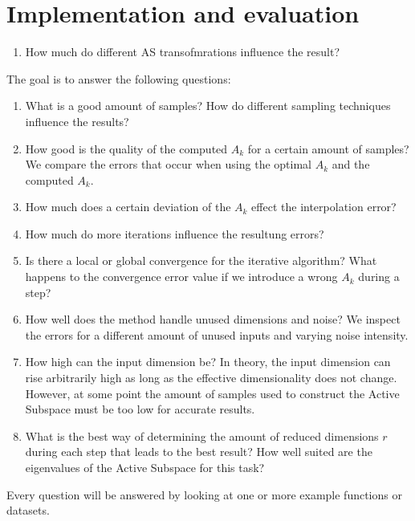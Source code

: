 \documentclass[
  a4paper,  %
  twoside,  %
  bibliography=totoc,
  headsepline,
  cleardoublepage=empty,
  parskip=half,
  draft=false
]{scrbook}
\begin{document}
\chapter{Implementation and evaluation}

\begin{enumerate}
\item How much do different AS transofmrations influence the result?
\end{enumerate}

The goal is to answer the following questions:

\begin{enumerate}
\item What is a good amount of samples? How do different sampling techniques influence the results?

\item How good is the quality of the computed $A_k$ for a certain amount of samples? We compare the errors that occur when using the optimal $A_k$ and the computed $A_k$.

\item How much does a certain deviation of the $A_k$ effect the interpolation error?

\item How much do more iterations influence the resultung errors?

\item Is there a local or global convergence for the iterative algorithm? What happens to the convergence error value if we introduce a wrong $A_k$ during a step?

\item How well does the method handle unused dimensions and noise? We inspect the errors for a different amount of unused inputs and varying noise intensity.

\item How high can the input dimension be? In theory, the input dimension can rise arbitrarily high as long as the effective dimensionality does not change. However, at some point the amount of samples used to construct the Active Subspace must be too low for accurate results.

\item What is the best way of determining the amount of reduced dimensions $r$ during each step that leads to the best result? How well suited are the eigenvalues of the Active Subspace for this task?
\end{enumerate}

Every question will be answered by looking at one or more example functions or datasets.
\end{document}
